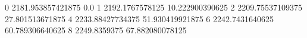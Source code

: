 0 2181.953857421875 0.0
1 2192.1767578125 10.222900390625
2 2209.75537109375 27.801513671875
4 2233.88427734375 51.930419921875
6 2242.7431640625 60.789306640625
8 2249.8359375 67.882080078125
